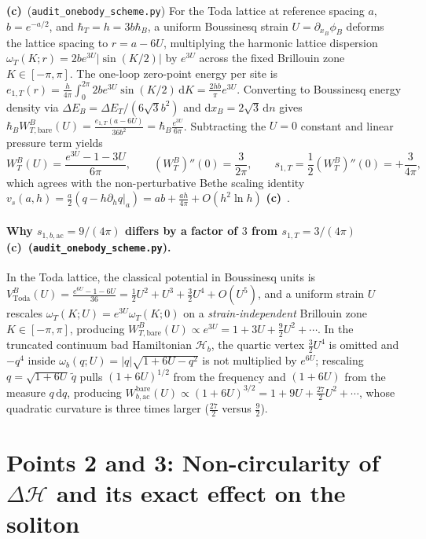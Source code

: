 \documentclass[11pt,a4paper]{article}
\newcommand{\Lc}{\textbf{(c)}\ }
\newcommand{\dd}{\mathrm d}
\newcommand{\scr}{\texttt{audit\_\allowbreak onebody\_\allowbreak scheme.py}}
\begin{document}
\Lc (\scr) For the Toda lattice at reference spacing $a$, $b = e^{-a/2}$, and
$\hbar_T = h = 3b\hbar_B$, a uniform Boussinesq strain $U = \partial_{x_B}\phi_B$
deforms the lattice spacing to $r = a - 6U$, multiplying the harmonic lattice
dispersion $\omega_T(K;r) = 2b e^{3U}|\sin(K/2)|$ by $e^{3U}$ across the fixed
Brillouin zone $K\in[-\pi,\pi]$. The one-loop zero-point energy per site is
$e_{1,T}(r) = \frac{h}{4\pi}\int_0^{2\pi} 2be^{3U}\sin(K/2)\,\dd K = \frac{2hb}{\pi}e^{3U}$.
Converting to Boussinesq energy density via $\Delta E_B = \Delta E_T/(6\sqrt{3}b^2)$
and $\dd x_B = 2\sqrt{3}\,\dd n$ gives $\hbar_B W_{T,\mathrm{bare}}^B(U) = \frac{e_{1,T}(a-6U)}{36b^2}
= \hbar_B\frac{e^{3U}}{6\pi}$. Subtracting the $U=0$ constant and linear pressure term yields
\begin{equation}
  W_T^B(U) = \frac{e^{3U} - 1 - 3U}{6\pi},
  \qquad
  (W_T^B)''(0) = \frac{3}{2\pi},
  \qquad
  s_{1,T} = \frac{1}{2}(W_T^B)''(0) = +\frac{3}{4\pi},
  \label{eq:WTB}
\end{equation}
which agrees with the non-perturbative Bethe scaling identity
$v_s(a,h) = \frac{a}{2}(q - h\partial_h q|_a) = ab + \frac{ah}{4\pi} + O(h^2\ln h)$ \Lc.

\paragraph{Why $s_{1,b,\mathrm{ac}} = 9/(4\pi)$ differs by a factor of $3$ from $s_{1,T} = 3/(4\pi)$ \Lc (\scr).}
In the Toda lattice, the classical potential in Boussinesq units is
$V_{\mathrm{Toda}}^B(U) = \frac{e^{6U}-1-6U}{36} = \frac{1}{2}U^2 + U^3 + \frac{3}{2}U^4 + O(U^5)$,
and a uniform strain $U$ rescales $\omega_T(K;U) = e^{3U}\omega_T(K;0)$ on a
\emph{strain-independent} Brillouin zone $K\in[-\pi,\pi]$, producing
$W_{T,\mathrm{bare}}^B(U) \propto e^{3U} = 1 + 3U + \frac{9}{2}U^2 + \cdots$.
In the truncated continuum bad Hamiltonian $\mathcal{H}_b$, the quartic vertex
$\frac{3}{2}U^4$ is omitted and $-q^4$ inside $\omega_b(q;U) = |q|\sqrt{1+6U-q^2}$ is
not multiplied by $e^{6U}$; rescaling $q = \sqrt{1+6U}\,\tilde{q}$ pulls $(1+6U)^{1/2}$
from the frequency and $(1+6U)$ from the measure $q\,\dd q$, producing
$W_{b,\mathrm{ac}}^{\mathrm{bare}}(U) \propto (1+6U)^{3/2} = 1 + 9U + \frac{27}{2}U^2 + \cdots$,
whose quadratic curvature is three times larger ($\frac{27}{2}$ versus $\frac{9}{2}$).

\section{\texorpdfstring{Points 2 and 3: Non-circularity of $\Delta\mathcal{H}$ and its exact effect on the soliton}{Points 2 and 3: Non-circularity of Delta H and its exact effect on the soliton}}
\end{document}
